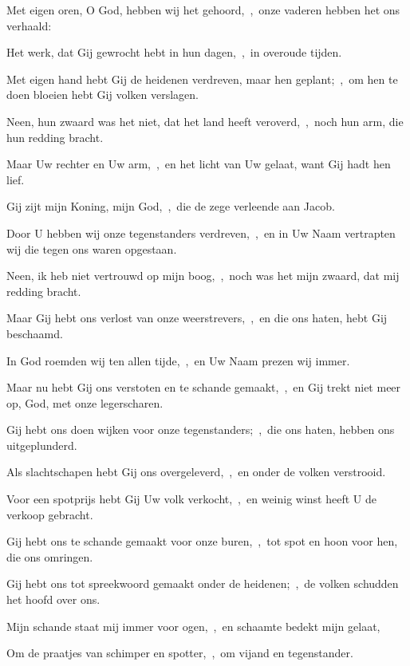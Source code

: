 \documentclass[12pt,twoside,a5paper]{article}
\begin{document}
\begin{halfparskip}
   Met eigen oren, O God, hebben wij het gehoord,~\sep\ onze vaderen hebben het ons verhaald:


  Het werk, dat Gij gewrocht hebt in hun dagen,~\sep\ in overoude tijden.

  Met eigen hand hebt Gij de heidenen verdreven, maar hen geplant;~\sep\ om hen te doen bloeien hebt Gij volken verslagen.

  Neen, hun zwaard was het niet, dat het land heeft veroverd,~\sep\ noch hun arm, die hun redding bracht.

  Maar Uw rechter en Uw arm,~\sep\ en het licht van Uw gelaat, want Gij hadt hen lief.

  Gij zijt mijn Koning, mijn God,~\sep\ die de zege verleende aan Jacob.

  Door U hebben wij onze tegenstanders verdreven,~\sep\ en in Uw Naam vertrapten wij die tegen ons waren opgestaan.

  Neen, ik heb niet vertrouwd op mijn boog,~\sep\ noch was het mijn zwaard, dat mij redding bracht.

  Maar Gij hebt ons verlost van onze weerstrevers,~\sep\ en die ons haten, hebt Gij beschaamd.

  In God roemden wij ten allen tijde,~\sep\ en Uw Naam prezen wij immer.

  Maar nu hebt Gij ons verstoten en te schande gemaakt,~\sep\ en Gij trekt niet meer op, God, met onze legerscharen.

  Gij hebt ons doen wijken voor onze tegenstanders;~\sep\ die ons haten, hebben ons uitgeplunderd.

  Als slachtschapen hebt Gij ons overgeleverd,~\sep\ en onder de volken verstrooid.

  Voor een spotprijs hebt Gij Uw volk verkocht,~\sep\ en weinig winst heeft U de verkoop gebracht.

  Gij hebt ons te schande gemaakt voor onze buren,~\sep\ tot spot en hoon voor hen, die ons omringen.

  Gij hebt ons tot spreekwoord gemaakt onder de heidenen;~\sep\ de volken schudden het hoofd over ons.

  Mijn schande staat mij immer voor ogen,~\sep\ en schaamte bedekt mijn gelaat,

  Om de praatjes van schimper en spotter,~\sep\ om vijand en tegenstander.


\end{halfparskip}
\end{document}
